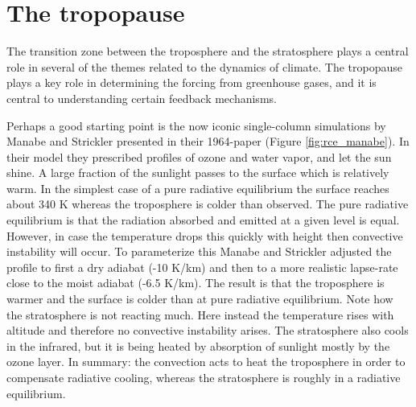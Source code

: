 \documentclass[12pt]{book}
\begin{document}
\section{The tropopause}
The transition zone between the troposphere and the stratosphere plays a central role in several of the themes related to the dynamics of climate. The tropopause plays a key role in determining the forcing from greenhouse gases, and it is central to understanding certain feedback mechanisms.

Perhaps a good starting point is the now iconic single-column simulations by Manabe and Strickler presented in their 1964-paper\citep{Manabe1964} (Figure \ref{fig:rce_manabe}). In their model they prescribed profiles of ozone and water vapor, and let the sun shine. A large fraction of the sunlight passes to the surface which is relatively warm. In the simplest case of a pure radiative equilibrium the surface reaches about 340 K whereas the troposphere is colder than observed. The pure radiative equilibrium is that the radiation absorbed and emitted at a given level is equal. However, in case the temperature drops this quickly with height then convective instability will occur. To parameterize this Manabe and Strickler adjusted the profile to first a dry adiabat (-10 K/km) and then to a more realistic lapse-rate close to the moist adiabat (-6.5 K/km). The result is that the troposphere is warmer and the surface is colder than at pure radiative equilibrium. Note how the stratosphere is not reacting much. Here instead the temperature rises with altitude and therefore no convective instability arises. The stratosphere also cools in the infrared, but it is being heated by absorption of sunlight mostly by the ozone layer. In summary: the convection acts to heat the troposphere in order to compensate radiative cooling, whereas the stratosphere is roughly in a radiative equilibrium. 
\end{document}
